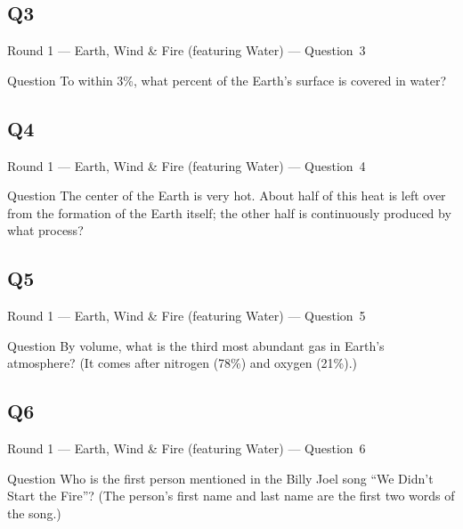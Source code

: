 \documentclass[11pt]{beamer}
\begin{document}
\subsection*{Q3}
\begin{frame}[t]{Round 1 --- Earth, Wind \& Fire (featuring Water) --- \mbox{Question 3}}
\vspace{-0.5em}
\begin{block}{Question}
To within 3\%, what percent of the Earth's surface is covered in water?
\end{block}
\end{frame}
\subsection*{Q4}
\begin{frame}[t]{Round 1 --- Earth, Wind \& Fire (featuring Water) --- \mbox{Question 4}}
\vspace{-0.5em}
\begin{block}{Question}
The center of the Earth is very hot. About half of this heat is left over from the formation of the Earth itself; the other half is continuously produced by what process?
\end{block}
\end{frame}
\subsection*{Q5}
\begin{frame}[t]{Round 1 --- Earth, Wind \& Fire (featuring Water) --- \mbox{Question 5}}
\vspace{-0.5em}
\begin{block}{Question}
By volume, what is the third most abundant gas  in Earth's atmosphere? (It comes after nitrogen (78\%) and oxygen (21\%).)
\end{block}
\end{frame}
\subsection*{Q6}
\begin{frame}[t]{Round 1 --- Earth, Wind \& Fire (featuring Water) --- \mbox{Question 6}}
\vspace{-0.5em}
\begin{block}{Question}
Who is the first person mentioned in the Billy Joel song ``We Didn't Start the Fire''? (The person's first name and last name are the first two words of the song.)
\end{block}
\end{frame}
\end{document}
